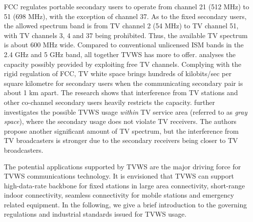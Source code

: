 FCC regulates portable secondary users to operate from channel 21 (512 MHz) to 51 (698 MHz), with the exception of channel 37.
As to the fixed secondary users, the allowed spectrum band is from TV channel 2 (54 MHz) to TV channel 51, with TV channels 3, 4 and 37 being prohibited.
Thus, the available TV spectrum is about 600 MHz wide. 
Compared to conventional unlicensed ISM bands in the 2.4 GHz and 5 GHz band, all together TVWS has more to offer.
\cite{DySpAN10MeasuringWhitespaceCapacity} analyses the capacity possibly provided by exploiting free TV channels. 
Complying with the rigid regulation of FCC, TV white space brings hundreds of kilobits/sec per square kilometre for secondary users when the communicating secondary pair is about 1 km apart.
The research shows that interference from TV stations and other co-channel secondary users heavily restricts the capacity.
\cite{tvgreyspace12} further investigates the possible TVWS usage \textit{within} TV service area (referred to as \textit{gray space}), where the secondary usage does not violate TV receivers.
The authors propose another significant amount of TV spectrum, but the interference from TV broadcasters is stronger due to the secondary receivers being closer to TV broadcasters. 

The potential applications supported by TVWS are the major driving force for TVWS communications technology.
It is envisioned that TVWS can support high-data-rate backbone for fixed stations in large area connectivity, short-range indoor connectivity, seamless connectivity for mobile stations and emergency related equipment. 
In the following, we give a brief introduction to the governing regulations and industrial standards issued for TVWS usage.







